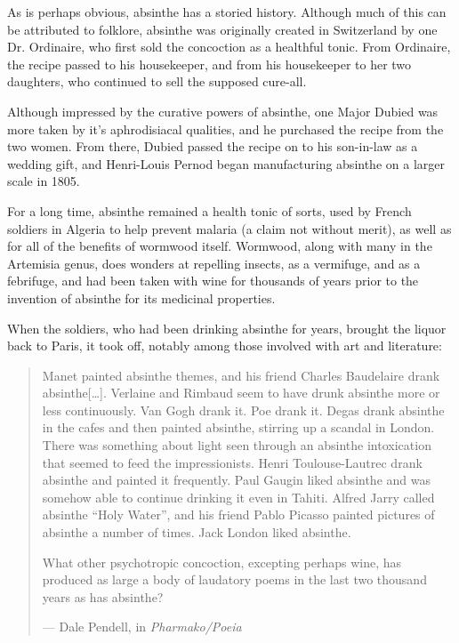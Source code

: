 \documentclass[12pt,letterpaper,oneside]{memoir}
\begin{document}
  As is perhaps obvious, absinthe has a storied history.  Although much of this can be attributed to folklore, absinthe was originally created in Switzerland by one Dr. Ordinaire, who first sold the concoction as a healthful tonic.  From Ordinaire, the recipe passed to his housekeeper, and from his housekeeper to her two daughters, who continued to sell the supposed cure-all.

  Although impressed by the curative powers of absinthe, one Major Dubied was more taken by it's aphrodisiacal qualities, and he purchased the recipe from the two women.  From there, Dubied passed the recipe on to his son-in-law as a wedding gift, and Henri-Louis Pernod began manufacturing absinthe on a larger scale in 1805.

  For a long time, absinthe remained a health tonic of sorts, used by French soldiers in Algeria to help prevent malaria (a claim not without merit), as well as for all of the benefits of wormwood itself.  Wormwood, along with many in the Artemisia genus, does wonders at repelling insects, as a vermifuge, and as a febrifuge, and had been taken with wine for thousands of years prior to the invention of absinthe for its medicinal properties.


  When the soldiers, who had been drinking absinthe for years, brought the liquor back to Paris, it took off, notably among those involved with art and literature:

  \begin{quotation}
    Manet painted absinthe themes, and his friend Charles Baudelaire drank absinthe[\ldots].  Verlaine and Rimbaud seem to have drunk absinthe more or less continuously.  Van Gogh drank it.  Poe drank it.  Degas drank absinthe in the cafes and then painted absinthe, stirring up a scandal in London.  There was something about light seen through an absinthe intoxication that seemed to feed the impressionists.  Henri Toulouse-Lautrec drank absinthe and painted it frequently.  Paul Gaugin liked absinthe and was somehow able to continue drinking it even in Tahiti.  Alfred Jarry called absinthe ``Holy Water'', and his friend Pablo Picasso painted pictures of absinthe a number of times.  Jack London liked absinthe.

    What other psychotropic concoction, excepting perhaps wine, has produced as large a body of laudatory poems in the last two thousand years as has absinthe?

    \vspace{14pt}
    \noindent--- Dale Pendell, in \textit{Pharmako/Poeia}
  \end{quotation}
\end{document}

